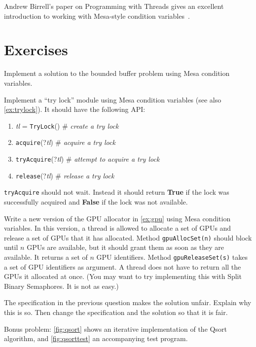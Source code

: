 \documentclass{report}
\begin{document}
Andrew Birrell's paper on Programming with Threads gives an excellent
introduction to working with Mesa-style condition variables~\cite{Birrell89}.

\section*{Exercises}
\begin{problems}
\item \label{ex:bbmesa} Implement a solution to the bounded buffer problem using Mesa condition
variables.
\item Implement a ``try lock'' module using Mesa condition variables
(see also \autoref{ex:trylock}).  It should
have the following API:
\begin{enumerate}
\item \textit{tl} = \texttt{TryLock}() \# \emph{create a try lock}
\item \texttt{acquire}(?\textit{tl}) \# \emph{acquire a try lock}
\item \texttt{tryAcquire}(?\textit{tl}) \# \emph{attempt to acquire a try lock}
\item \texttt{release}(?\textit{tl}) \# \emph{release a try lock}
\end{enumerate}
\noindent
\texttt{tryAcquire} should not wait.
Instead it should return \textbf{True} if the lock was successfully
acquired and \textbf{False} if the lock was not available.
\item Write a new version of the GPU allocator in \autoref{ex:gpu}
using Mesa condition variables.
In this version,
a thread is allowed to allocate a set of GPUs and release a set of GPUs that it
has allocated.  Method \texttt{gpuAllocSet(n)} should block until $n$ GPUs are
available, but it should grant them as soon as they are available.
It returns a set of $n$ GPU identifiers.
Method \texttt{gpuReleaseSet(s)} takes a set of GPU identifiers as argument.
A thread does not have to return all the GPUs it allocated at once.
(You may want to try implementing this with Split Binary Semaphores.  It is not as easy.)
\item The specification in the previous question makes the solution unfair.
Explain why this is so.  Then change the specification and the solution so that
it is fair.
\item \label{ex:qsort}
Bonus problem: \autoref{fig:qsort} shows an iterative implementation of the Qsort
algorithm, and \autoref{fig:qsorttest} an accompanying test program.

\end{problems}
\end{document}
